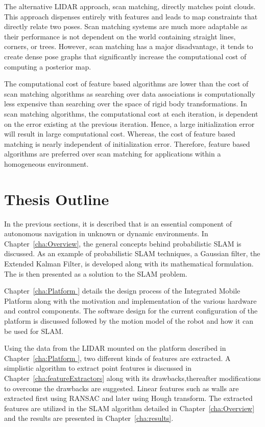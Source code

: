 	The alternative LIDAR approach, scan matching, directly matches point clouds. This approach dispenses entirely with features and leads to map constraints that directly relate two poses. Scan matching systems are much more adaptable as their performance is not dependent on the world containing straight lines, corners, or trees. However, scan matching has a major disadvantage, it tends to create dense pose graphs that significantly increase the computational cost of computing a posterior map. 
	
	The computational cost of feature based algorithms are lower than the cost of scan matching algorithms as searching over data associations is computationally less expensive than searching over the space of rigid body transformations. In scan matching algorithms, the computational cost at each iteration, is dependent on the error existing at the previous iteration. Hence, a large initialization error will result in large computational cost. Whereas, the cost of feature based matching is nearly independent of initialization error. Therefore, feature based algorithms are preferred over scan matching for applications within a homogeneous environment.
	
	\section {Thesis Outline}
	
	In the previous sections, it is  described that \slam  is an essential component of autonomous navigation in unknown or dynamic environments. In Chapter~\ref{cha:Overview}, the general concepts behind probabilistic SLAM is discussed. As an example of probabilistic SLAM techniques, a Gaussian filter, the Extended Kalman Filter, is developed along with its mathematical formulation. The \ekf is then presented as a solution to the SLAM problem. 
	
	Chapter~\ref{cha:Platform } details the design process of the Integrated Mobile Platform along with the motivation and implementation of the various hardware and control components. The software design for the current configuration of the platform is discussed followed by the motion model of the robot and how it can be used for SLAM. 
	
	Using the data from the LIDAR mounted on the platform described in Chapter~\ref{cha:Platform }, two different kinds of features are extracted. A simplistic algorithm to extract point features is discussed in Chapter~\ref{cha:featureExtractors} along with its drawbacks,thereafter modifications to overcome the drawbacks are suggested. Linear features such as walls are extracted first using RANSAC\cite{Fischler1981} and later using Hough transform\cite{Hu1998}. The extracted features are utilized in the SLAM algorithm detailed in Chapter~\ref{cha:Overview} and the results are presented in Chapter~\ref{cha:results}. 
	
